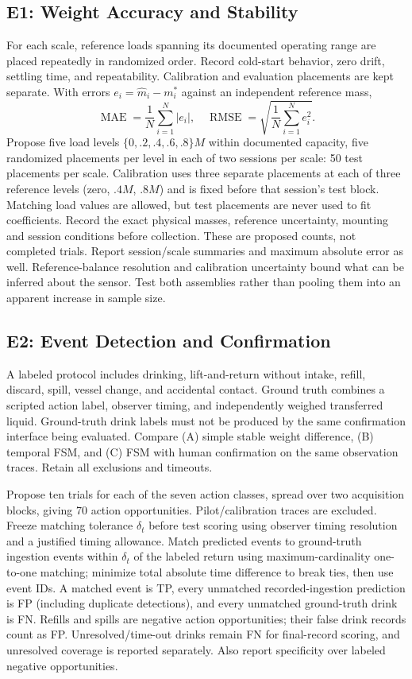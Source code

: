 \subsection{E1: Weight Accuracy and Stability}
For each scale, reference loads spanning its documented operating range are placed repeatedly in randomized order. Record cold-start behavior, zero drift, settling time, and repeatability. Calibration and evaluation placements are kept separate. With errors $e_i=\hat m_i-m_i^*$ against an independent reference mass,
\begin{equation}\operatorname{MAE}=\frac{1}{N}\sum_{i=1}^N|e_i|,\quad
\operatorname{RMSE}=\sqrt{\frac{1}{N}\sum_{i=1}^Ne_i^2}.\label{eq:errors}\end{equation}
Propose five load levels $\{0,.2,.4,.6,.8\}M$ within documented capacity, five randomized placements per level in each of two sessions per scale: 50 test placements per scale. Calibration uses three separate placements at each of three reference levels (zero, $.4M$, $.8M$) and is fixed before that session's test block. Matching load values are allowed, but test placements are never used to fit coefficients. Record the exact physical masses, reference uncertainty, mounting and session conditions before collection. These are proposed counts, not completed trials. Report session/scale summaries and maximum absolute error as well. Reference-balance resolution and calibration uncertainty bound what can be inferred about the sensor. Test both assemblies rather than pooling them into an apparent increase in sample size.

\subsection{E2: Event Detection and Confirmation}
A labeled protocol includes drinking, lift-and-return without intake, refill, discard, spill, vessel change, and accidental contact. Ground truth combines a scripted action label, observer timing, and independently weighed transferred liquid. Ground-truth drink labels must not be produced by the same confirmation interface being evaluated. Compare (A) simple stable weight difference, (B) temporal FSM, and (C) FSM with human confirmation on the same observation traces. Retain all exclusions and timeouts.

Propose ten trials for each of the seven action classes, spread over two acquisition blocks, giving 70 action opportunities. Pilot/calibration traces are excluded. Freeze matching tolerance $\delta_t$ before test scoring using observer timing resolution and a justified timing allowance. Match predicted events to ground-truth ingestion events within $\delta_t$ of the labeled return using maximum-cardinality one-to-one matching; minimize total absolute time difference to break ties, then use event IDs. A matched event is TP, every unmatched recorded-ingestion prediction is FP (including duplicate detections), and every unmatched ground-truth drink is FN. Refills and spills are negative action opportunities; their false drink records count as FP. Unresolved/time-out drinks remain FN for final-record scoring, and unresolved coverage is reported separately. Also report specificity over labeled negative opportunities.

